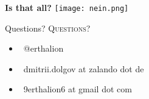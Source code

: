 \documentclass[usenames,dvipsnames, 18pt, compress, aspectratio=169]{beamer}
\def\twitter{{\FA \faTwitter}}
\def\email{{\FA \faEnvelope}}
\begin{document}
\begin{frame}[fragile]{}
    \frametitle{}

    \begin{center}
     {
        \textbf{Is that all?}
    }
     {
        \texttt{[image: nein.png]}
    }
     {
    }

    \end{center}
\end{frame}

\fontsize{18pt}{18}\selectfont
\begin{frame}
  \vspace*{2.5cm}
  \begin{minipage}[b][\paperheight]{\textwidth}
  \begin{center}

      \linespread{1.0}%
      \if@noSmallCapitals%
        Questions?
      \else%
        \scshape{\color{black} Questions?}%
      \fi%
      \vspace*{0.3em}

      \fontsize{13pt}{14}\selectfont
        \begin{itemize}[label={}]
            \item {\color{black} \twitter\ @erthalion}
            \item {\color{black} \email\ dmitrii.dolgov at zalando dot de}
            \item {\color{black} \email\ 9erthalion6 at gmail dot com}
        \end{itemize}
      \vspace*{2.5em}%

    \vfill
    \vspace*{2em}
  \end{center}
  \end{minipage}

\end{frame}
\end{document}
